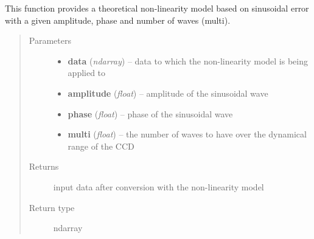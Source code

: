 \documentclass[a4paper,12pt,english]{sphinxmanual}
\begin{document}
\begin{fulllineitems}
\label{instrument:support.VISinstrumentModel.CCDnonLinearityModelSinusoidal}
This function provides a theoretical non-linearity model based on sinusoidal error with a given
amplitude, phase and number of waves (multi).
\begin{quote}\begin{description}
\item[{Parameters}] \leavevmode\begin{itemize}
\item {} 
\textbf{data} (\emph{ndarray}) -- data to which the non-linearity model is being applied to

\item {} 
\textbf{amplitude} (\emph{float}) -- amplitude of the sinusoidal wave

\item {} 
\textbf{phase} (\emph{float}) -- phase of the sinusoidal wave

\item {} 
\textbf{multi} (\emph{float}) -- the number of waves to have over the dynamical range of the CCD

\end{itemize}

\item[{Returns}] \leavevmode
input data after conversion with the non-linearity model

\item[{Return type}] \leavevmode
ndarray

\end{description}\end{quote}

\end{fulllineitems}

\end{document}
